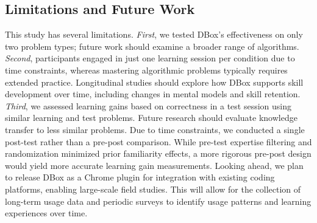 




\subsection{Limitations and Future Work}

This study has several limitations. \emph{First}, we tested DBox's effectiveness on only two problem types; future work should examine a broader range of algorithms. \emph{Second}, participants engaged in just one learning session per condition due to time constraints, whereas mastering algorithmic problems typically requires extended practice. Longitudinal studies should explore how DBox supports skill development over time, including changes in mental models and skill retention. \emph{Third}, we assessed learning gains based on correctness in a test session using similar learning and test problems. Future research should evaluate knowledge transfer to less similar problems. Due to time constraints, we conducted a single post-test rather than a pre-post comparison. While pre-test expertise filtering and randomization minimized prior familiarity effects, a more rigorous pre-post design would yield more accurate learning gain measurements. Looking ahead, we plan to release DBox as a Chrome plugin for integration with existing coding platforms, enabling large-scale field studies. This will allow for the collection of long-term usage data and periodic surveys to identify usage patterns and learning experiences over time.



